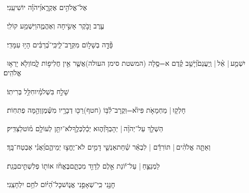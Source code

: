 \documentclass[12pt]{article}
\newcommand{\loc}[1]{\textsuperscript{\locf{#1}}}
\begin{document}
{\loc{ יז}~}‏ אֶל־אֱלֹהִ֣ים אֶקְרָ֑א{\hfill}וַ֝יהֹוָ֗ה יוֹשִׁיעֵֽנִי׃\par

{\loc{ יח}~}‏עֶ֤רֶב וָבֹ֣קֶר  אָשִׂ֣יחָה וְאֶהֱמֶ֑ה{\hfill}וַיִּשְׁמַ֥ע קוֹלִֽי׃\par

{\loc{ יט}~}‏פָּ֘דָ֤ה בְשָׁל֣וֹם  מִקְּרׇב־לִ֑י{\hfill}כִּֽי־בְ֝רַבִּ֗ים הָי֥וּ עִמָּדִֽי׃\par

{\loc{ כ}~}‏יִשְׁמַ֤ע |  אֵ֨ל |  וְֽיַעֲנֵם֮{\hfill}וְיֹ֤שֵׁ֥ב קֶ֗דֶם א=סֶ֥לָה (המשטת סימן העולה)\newline\hspace*{.5em}אֲשֶׁ֤ר אֵ֣ין חֲלִיפ֣וֹת לָ֑מוֹ{\hfill}וְלֹ֖א יָרְא֣וּ אֱלֹהִֽים׃\par

{\loc{ כא}~}‏שָׁלַ֣ח  בִּשְׁלֹמָ֗יו{\hfill}חִלֵּ֥ל בְּרִיתֽוֹ׃\par

{\loc{ כב}~}‏חָלְק֤וּ |  מַחְמָאֹ֣ת פִּיו֮{\hfill}א=וּֽקֲרָב־לִ֫בּ֥וֹ (חטף)\newline\hspace*{.5em}רַכּ֖וּ דְבָרָ֥יו מִשֶּׁ֗מֶן{\hfill}וְהֵ֣מָּה פְתִחֽוֹת׃\par

{\loc{ כג}~}‏הַשְׁלֵ֤ךְ עַל־יְהֹוָ֨ה |  יְהָבְךָ֮{\hfill}וְה֢וּא יְכַ֫לְכְּלֶ֥ךָ\newline\hspace*{.5em}לֹא־יִתֵּ֖ן לְעוֹלָ֥ם מ֗וֹט{\hfill}לַצַּדִּֽיק׃\par

{\loc{ כד}~}‏וְאַתָּ֤ה אֱלֹהִ֨ים | {\hfill}תּוֹרִדֵ֬ם | לִבְאֵ֬ר שַׁ֗חַת\newline\hspace*{.5em}אַנְשֵׁ֤י דָמִ֣ים  לֹא־יֶחֱצ֣וּ יְמֵיהֶ֑ם{\hfill}וַ֝אֲנִ֗י אֶבְטַח־בָּֽךְ׃\par\pend

\pstart[\subsection*{\textcolor{red}{פרק נו}}]\label{פרק נו}
{\loc{ א}~}‏לַמְנַצֵּ֤חַ |  עַל־י֬וֹנַת אֵ֣לֶם \newline\hspace*{.5em}לְדָוִ֣ד מִכְתָּ֑ם{\hfill}בֶּאֱחֹ֨ז אוֹת֖וֹ פְלִשְׁתִּ֣ים\hspace{1em}בְּגַֽת׃\par

{\loc{ ב}~}‏חׇנֵּ֣נִי  כִּֽי־שְׁאָפַ֣נִי אֱנ֑וֹשׁ{\hfill}כׇּל־הַ֝יּ֗וֹם לֹחֵ֥ם יִלְחָצֵֽנִי׃\par
\end{document}
